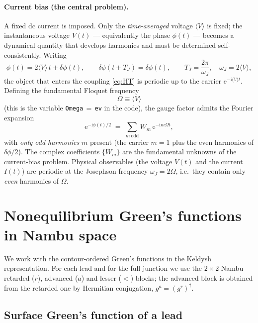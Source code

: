 \documentclass[11pt,a4paper]{article}
\newcommand{\ii}{\mathrm{i}}
\newcommand{\ee}{\mathrm{e}}
\newcommand{\Om}{\Omega}
\newcommand{\Wm}{W}
\begin{document}
\paragraph{Current bias (the central problem).}
A fixed dc current is imposed.  Only the \emph{time-averaged} voltage
$\langle V\rangle$ is fixed; the instantaneous voltage $V(t)$ --- equivalently
the phase $\phi(t)$ --- becomes a dynamical quantity that develops harmonics and
must be determined self-consistently.  Writing
\begin{equation}
  \phi(t) = 2\langle V\rangle\,t + \delta\phi(t),
  \qquad \delta\phi(t+T_J)=\delta\phi(t),
  \qquad T_J = \frac{2\pi}{\omega_J},\quad \omega_J = 2\langle V\rangle,
\end{equation}
the object that enters the coupling \eqref{eq:HT} is periodic up to the carrier
$\ee^{-\ii\langle V\rangle t}$.  Defining the fundamental Floquet frequency
\begin{equation}
  \boxed{\ \Om \equiv \langle V\rangle\ }
\end{equation}
(this is the variable \texttt{Omega}\,$=$\,\texttt{ev} in the code), the gauge
factor admits the Fourier expansion
\begin{equation}
  \ee^{-\ii\phi(t)/2} \;=\; \sum_{m\ \mathrm{odd}} \Wm_m\,\ee^{-\ii m\Om t},
  \label{eq:Wexpansion}
\end{equation}
with \emph{only odd harmonics} $m$ present (the carrier $m=1$ plus the even
harmonics of $\delta\phi/2$).  The complex coefficients $\{\Wm_m\}$ are the
fundamental unknowns of the current-bias problem.  Physical observables (the
voltage $V(t)$ and the current $I(t)$) are periodic at the Josephson frequency
$\omega_J=2\Om$, i.e.\ they contain only \emph{even} harmonics of $\Om$.

\section{Nonequilibrium Green's functions in Nambu space}
\label{sec:gf}

We work with the contour-ordered Green's functions in the Keldysh
representation.  For each lead and for the full junction we use the
$2\times2$ Nambu retarded ($r$), advanced ($a$) and lesser ($<$) blocks; the
advanced block is obtained from the retarded one by Hermitian conjugation,
$g^a=(g^r)^\dagger$.

\subsection{Surface Green's function of a lead}
\label{sec:surface}
\end{document}
